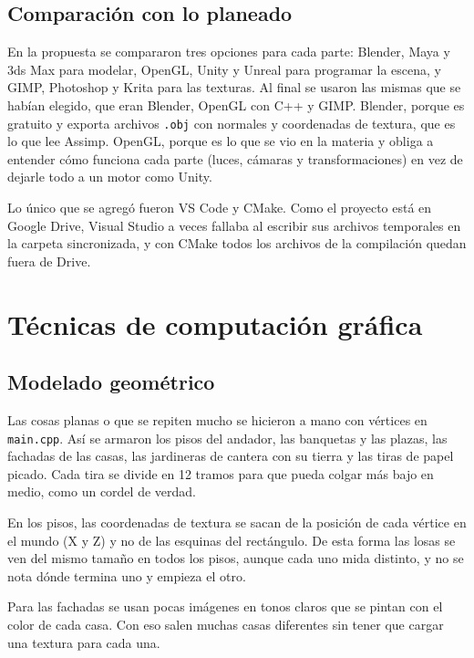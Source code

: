 \documentclass[11pt,a4paper]{article}
\begin{document}
\subsection{Comparación con lo planeado}

En la propuesta se compararon tres opciones para cada parte: Blender, Maya y 3ds Max para modelar, OpenGL, Unity y Unreal para programar la escena, y GIMP, Photoshop y Krita para las texturas. Al final se usaron las mismas que se habían elegido, que eran Blender, OpenGL con C++ y GIMP. Blender, porque es gratuito y exporta archivos \texttt{.obj} con normales y coordenadas de textura, que es lo que lee Assimp. OpenGL, porque es lo que se vio en la materia y obliga a entender cómo funciona cada parte (luces, cámaras y transformaciones) en vez de dejarle todo a un motor como Unity.

Lo único que se agregó fueron VS Code y CMake. Como el proyecto está en Google Drive, Visual Studio a veces fallaba al escribir sus archivos temporales en la carpeta sincronizada, y con CMake todos los archivos de la compilación quedan fuera de Drive.



\section{Técnicas de computación gráfica}

\subsection{Modelado geométrico}

Las cosas planas o que se repiten mucho se hicieron a mano con vértices en \texttt{main.cpp}. Así se armaron los pisos del andador, las banquetas y las plazas, las fachadas de las casas, las jardineras de cantera con su tierra y las tiras de papel picado. Cada tira se divide en 12 tramos para que pueda colgar más bajo en medio, como un cordel de verdad.

En los pisos, las coordenadas de textura se sacan de la posición de cada vértice en el mundo (X y Z) y no de las esquinas del rectángulo. De esta forma las losas se ven del mismo tamaño en todos los pisos, aunque cada uno mida distinto, y no se nota dónde termina uno y empieza el otro.

Para las fachadas se usan pocas imágenes en tonos claros que se pintan con el color de cada casa. Con eso salen muchas casas diferentes sin tener que cargar una textura para cada una.
\end{document}
